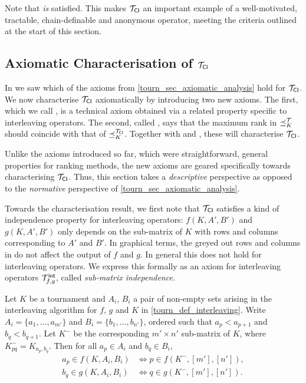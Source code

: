 Note that \anon{} \emph{is} satisfied. This makes ${\mathcal{T}_{\mathsf{CI}}}$ an
important example of a well-motivated, tractable, chain-definable
and anonymous operator, meeting the criteria outlined at the start of
this section.

\subsection{Axiomatic Characterisation of ${\mathcal{T}_{\mathsf{CI}}}$}
\label{tourn_sec_axiomatic_characterisation_of_tcardint}

In  we saw which of the axioms from
\cref{tourn_sec_axiomatic_analysis} hold for ${\mathcal{T}_{\mathsf{CI}}}$. We now characterise
${\mathcal{T}_{\mathsf{CI}}}$ axiomatically by introducing two new axioms. The first, which we
call \rankremoval{}, is a technical axiom obtained via a related
property specific to interleaving operators. The second, called
\argmaxaxiom{}, says that the maximum rank in $\preceq_K^{\mathcal{T}}$ should coincide
with that of $\preceq_K^{{\mathcal{T}_{\mathsf{CI}}}}$. Together with \dualaxiom{} and
\chaindef{}, these will characterise ${\mathcal{T}_{\mathsf{CI}}}$.

Unlike the axioms introduced so far, which were straightforward, general
properties for ranking methods, the new axioms are geared specifically towards
characterising ${\mathcal{T}_{\mathsf{CI}}}$. Thus, this section takes a \emph{descriptive}
perspective as opposed to the \emph{normative} perspective of
\cref{tourn_sec_axiomatic_analysis}.

Towards the characterisation result, we first note that ${\mathcal{T}_{\mathsf{CI}}}$ satisfies
a kind of independence property for interleaving operators: $f(K, A', B')$ and
$g(K, A', B')$ only depends on the sub-matrix of $K$ with rows and columns
corresponding to $A'$ and $B'$. In graphical terms, the greyed out rows and
columns in  do not affect the output of $f$ and
$g$. In general this does not hold for interleaving operators. We express this
formally as an axiom for interleaving operators ${\mathcal{T}_{f, g}^\mathsf{int}}$, called
\emph{sub-matrix independence}.

\begin{axiom}[\smi{}]
    Let $K$ be a tournament and $A_i$, $B_i$ a pair of non-empty sets arising
    in the interleaving algorithm for $f$, $g$ and $K$ in
    \cref{tourn_def_interleaving}. Write $A_i = \{a_1, \ldots, a_{m'}\}$ and
    $B_i = \{b_1, \ldots, b_{n'}\}$, ordered such that $a_p < a_{p+1}$ and $b_q
    < b_{q+1}$. Let $K^-$ be the corresponding $m' \times n'$ sub-matrix of
    $K$, where $K^-_{pq} = K_{a_p,b_q}$. Then for all $a_p \in A_i$ and $b_q
    \in B_i$,
    \begin{align*}
        a_p \in f(K, A_i, B_i) &\iff p \in f(K^-, [m'], [n']), \\
        b_q \in g(K, A_i, B_i) &\iff q \in g(K^-, [m'], [n']).
    \end{align*}
\end{axiom}

